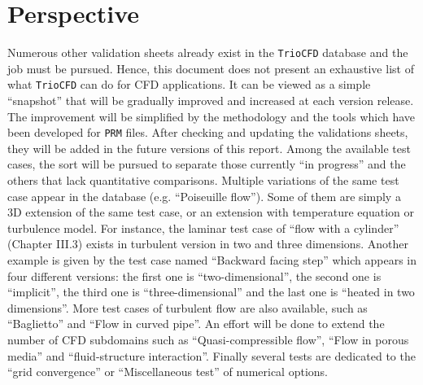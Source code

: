 \section*{Perspective}

Numerous other validation sheets already exist in the \texttt{TrioCFD}
database and the job must be pursued. Hence, this document does not
present an exhaustive list of what \texttt{TrioCFD} can do for CFD
applications. It can be viewed as a simple ``snapshot'' that will
be gradually improved and increased at each version release. The improvement
will be simplified by the methodology and the tools which have been
developed for \texttt{PRM} files. After checking and updating the
validations sheets, they will be added in the future versions of this
report. Among the available test cases, the sort will be pursued to
separate those currently ``in progress'' and the others that lack
quantitative comparisons. Multiple variations of the same test case
appear in the database (e.g. ``Poiseuille flow''). Some of them
are simply a 3D extension of the same test case, or an extension with
temperature equation or turbulence model. For instance, the laminar
test case of ``flow with a cylinder'' (Chapter III.3) exists in
turbulent version in two and three dimensions. Another example is
given by the test case named ``Backward facing step'' which appears
in four different versions: the first one is ``two-dimensional'',
the second one is ``implicit'', the third one is ``three-dimensional''
and the last one is ``heated in two dimensions''. More test cases
of turbulent flow are also available, such as ``Baglietto'' and
``Flow in curved pipe''. An effort will be done to extend the
number of CFD subdomains such as ``Quasi-compressible flow'', ``Flow
in porous media'' and ``fluid-structure interaction''. Finally
several tests are dedicated to the ``grid convergence'' or ``Miscellaneous
test'' of numerical options.
